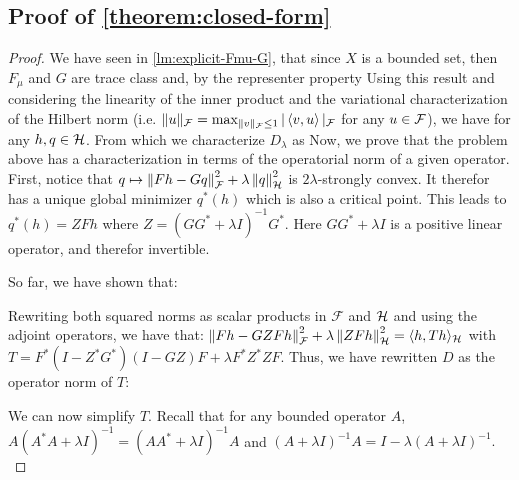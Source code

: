 \subsection{Proof of \cref{theorem:closed-form}}\label{sec:proof-closed-form}
\begin{proof}
We have seen in \cref{lm:explicit-Fmu-G}, that since $X$ is a bounded set, then $F_\mu$ and $G$ are trace class and, by the representer property
Using this result and considering the linearity of the inner product and the variational characterization of the Hilbert norm (i.e. $\|u\|_{\cal F} = \max_{\|v\|_{\cal F} \leq 1} |\left\langle{v},{u}\right\rangle|_{\cal F}$  for any $u \in {\cal F}$), we have
for any $h, q \in \mathcal H$. From which we characterize $D_\lambda$ as
Now, we prove that the problem above has a characterization in terms of the operatorial norm of a given operator.
First, notice that $q\mapsto \left\Vert{Fh - Gq}\right\Vert_\mathcal F^2 + \lambda \left\Vert{q}\right\Vert_\mathcal H^2$ is $2\lambda$-strongly convex. It therefor has a unique global minimizer $q^*(h)$ which is also a critical point. This leads to $q^*(h) = ZFh$ where $Z = (GG^* + \lambda I)^{-1}G^*$. Here $GG^* + \lambda I$ is a positive linear operator, and therefor invertible.

So far, we have shown that: 

Rewriting both squared norms as scalar products in $\mathcal F$ and $\mathcal H$ and using the adjoint operators, we have that:
$\left\Vert{Fh - GZFh}\right\Vert_\mathcal F^2 + \lambda \left\Vert{ZFh}\right\Vert_\mathcal H^2 = \langle h, Th\rangle_\mathcal H$ with $T = F^*(I - Z^*G^*)(I-GZ)F + \lambda F^* Z^*ZF$. Thus, we have rewritten $D$ as the operator norm of $T$: 

We can now simplify $T$. Recall that for any bounded operator $A$, $A(A^*A + \lambda I)^{-1} = (AA^* + \lambda I)^{-1}A$ and $(A + \lambda I)^{-1}A = I - \lambda(A + \lambda I)^{-1}.$


\end{proof}
